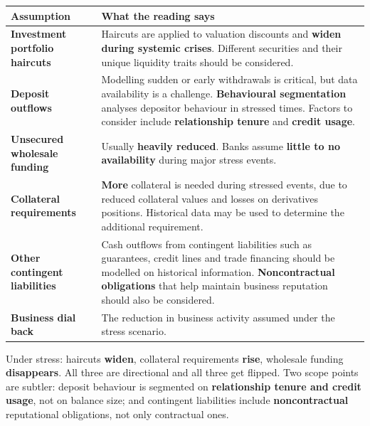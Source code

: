 \begin{center}
\small
\begin{tabularx}{\textwidth}{@{}p{4.0cm} X@{}}
\toprule
\rowcolor{FRMSoft}\textbf{Assumption} & \textbf{What the reading says} \\
\midrule
\textbf{Investment portfolio haircuts} & Haircuts are applied to valuation discounts and \textbf{widen during systemic crises}. Different securities and their unique liquidity traits should be considered. \\
\addlinespace
\textbf{Deposit outflows} & Modelling sudden or early withdrawals is critical, but data availability is a challenge. \textbf{Behavioural segmentation} analyses depositor behaviour in stressed times. Factors to consider include \textbf{relationship tenure} and \textbf{credit usage}. \\
\addlinespace
\textbf{Unsecured wholesale funding} & Usually \textbf{heavily reduced}. Banks assume \textbf{little to no availability} during major stress events. \\
\addlinespace
\textbf{Collateral requirements} & \textbf{More} collateral is needed during stressed events, due to reduced collateral values and losses on derivatives positions. Historical data may be used to determine the additional requirement. \\
\addlinespace
\textbf{Other contingent liabilities} & Cash outflows from contingent liabilities such as guarantees, credit lines and trade financing should be modelled on historical information. \textbf{Noncontractual obligations} that help maintain business reputation should also be considered. \\
\addlinespace
\textbf{Business dial back} & The reduction in business activity assumed under the stress scenario. \\
\bottomrule
\end{tabularx}
\end{center}

\begin{lrtrapbox}
Under stress: haircuts \textbf{widen}, collateral requirements \textbf{rise}, wholesale funding \textbf{disappears}. All three are directional and all three get flipped. Two scope points are subtler: deposit behaviour is segmented on \textbf{relationship tenure and credit usage}, not on balance size; and contingent liabilities include \textbf{noncontractual} reputational obligations, not only contractual ones.
\end{lrtrapbox}

